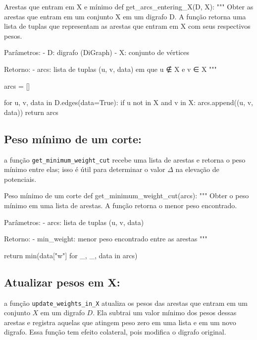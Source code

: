 \begin{pybox}{Arestas que entram em X e mínimo}
	def get_arcs_entering_X(D, X):
	"""
	Obter as arestas que entram em um conjunto X em um digrafo D.
	A função retorna uma lista de tuplas que representam as arestas que entram em X com seus respectivos pesos.

	Parâmetros:
	- D: digrafo (DiGraph)
	- X: conjunto de vértices

	Retorno:
	- arcs: lista de tuplas (u, v, data) em que u ∉ X e v ∈ X
	"""

	arcs = []

	for u, v, data in D.edges(data=True):
	if u not in X and v in X:
	arcs.append((u, v, data))
	return arcs
\end{pybox}

\subsection{Peso mínimo de um corte:}
a função \texttt{get\_minimum\_weight\_cut} recebe uma lista de arestas e retorna o peso mínimo entre elas; isso é útil para determinar o valor $\Delta$ na elevação de potenciais.

\begin{pybox}{Peso mínimo de um corte}
	def get_minimum_weight_cut(arcs):
	"""
	Obter o peso mínimo em uma lista de arestas.
	A função retorna o menor peso encontrado.

	Parâmetros:
	- arcs: lista de tuplas (u, v, data)

	Retorno:
	- min_weight: menor peso encontrado entre as arestas
	"""

	return min(data["w"] for _, _, data in arcs)
\end{pybox}

\subsection{Atualizar pesos em X:}
a função \texttt{update\_weights\_in\_X} atualiza os pesos das arestas que entram em um conjunto \(X\) em um digrafo \(D\). Ela subtrai um valor mínimo dos pesos dessas arestas e registra aquelas que atingem peso zero em uma lista e em um novo digrafo. Essa função tem efeito colateral, pois modifica o digrafo original.

